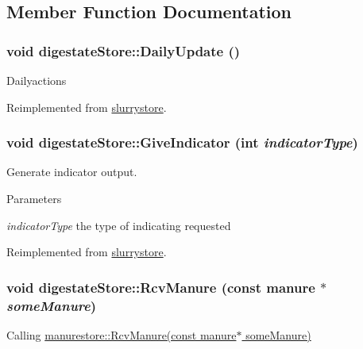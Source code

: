 \subsection{Member Function Documentation}
\hypertarget{classdigestate_store_a209611f25ea14ad07c9de42fa46eea05}{
\subsubsection[{DailyUpdate}]{\setlength{\rightskip}{0pt plus 5cm}void digestateStore::DailyUpdate ()}}
\label{classdigestate_store_a209611f25ea14ad07c9de42fa46eea05}
Dailyactions 

Reimplemented from \hyperlink{classslurrystore_a0e660eb43b403bef8aaefb8188a73d4f}{slurrystore}.\hypertarget{classdigestate_store_ae1402687e7bf67b150bf01e97c4798b9}{
\subsubsection[{GiveIndicator}]{\setlength{\rightskip}{0pt plus 5cm}void digestateStore::GiveIndicator (int {\em indicatorType})}}
\label{classdigestate_store_ae1402687e7bf67b150bf01e97c4798b9}


Generate indicator output. 
\begin{DoxyParams}{Parameters}
\item[{\em indicatorType}]the type of indicating requested \end{DoxyParams}


Reimplemented from \hyperlink{classslurrystore_a982183d9d72019736bfdb792c4cb5d78}{slurrystore}.\hypertarget{classdigestate_store_a840cf55a8a893f089c8c39a36cc3defe}{
\subsubsection[{RcvManure}]{\setlength{\rightskip}{0pt plus 5cm}void digestateStore::RcvManure (const {\bf manure} $\ast$ {\em someManure})}}
\label{classdigestate_store_a840cf55a8a893f089c8c39a36cc3defe}
Calling \hyperlink{classmanurestore_ab32685c2f4be9bb58269655cab7c96ee}{manurestore::RcvManure(const manure$\ast$ someManure)} 

